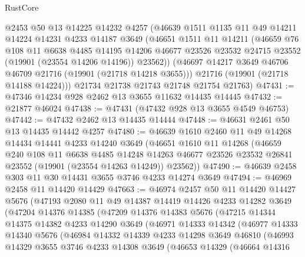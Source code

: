 \begin{lexlean}{RustCore}
\begin{coremodule}
      @2453
      @50
      @13
      @14225
      @14232
      @4257
      (@46639
        @1511
        @1135
        @11
        @49
        @14211
        @14224
        @14231
        @4233
        @14187
        @3649
        (@46651
          @1511
          @11
          @14211
          (@46659
            @76
            @108
            @11
            @6638
            @4485
            @14195
            @14206
            @46677
            @23526
            @23532
            @24715
            @23552
            (@19901 (@23554 @14206 @14196))
            @23562))
        (@46697 @14217 @3649 @46706 @46709 @21716 (@19901 (@21718 @14218 @3655)))
        @21716
        (@19901 (@21718 @14188 @14224)))
      @21734
      @21738
      @21743
      @21748
      @21754
      @21763)
@47431 := @47346 @14234 @928 @2462 @13 @3655 @11632 @14435 @14445
@47432 := @21877 @46024
@47438 := @47431 (@47432 @928 @13 @3655 @4549 @46753)
@47442 := @47432 @2462 @13 @14435 @14444
@47448 := @46631 @2461 @50 @13 @14435 @14442 @4257
@47480 := @46639
    @1610
    @2460
    @11
    @49
    @14268
    @14434
    @14441
    @4233
    @14240
    @3649
    (@46651
      @1610
      @11
      @14268
      (@46659
        @240
        @108
        @11
        @6638
        @4485
        @14248
        @14263
        @46677
        @23526
        @23532
        @26841
        @23552
        (@19901 (@23554 @14263 @14249))
        @23562))
@47490 := @46639 @2458 @303 @11 @30 @14431 @3655 @3746 @4233 @14274 @3649
@47494 := @46969 @2458 @11 @14420 @14429
@47663 := @46974
    @2457
    @50
    @11
    @14420
    @14427
    @5676
    (@47193
      @2080
      @11
      @49
      @14387
      @14419
      @14426
      @4233
      @14282
      @3649
      (@47204
        @14376
        @14385
        (@47209
          @14376
          @14383
          @5676
          (@47215
            @14344
            @14375
            @14382
            @4233
            @14290
            @3649
            (@46971
              @14333
              @14342
              (@46977
                @14333
                @14340
                @5676
                (@46984
                  @14332
                  @14339
                  @4233
                  @14298
                  @3649
                  @46810
                  (@46993
                    @14329
                    @3655
                    @3746
                    @4233
                    @14308
                    @3649
                    (@46653
                      @14329
                      (@46664
                        @14316

\end{coremodule}
\end{lexlean}
